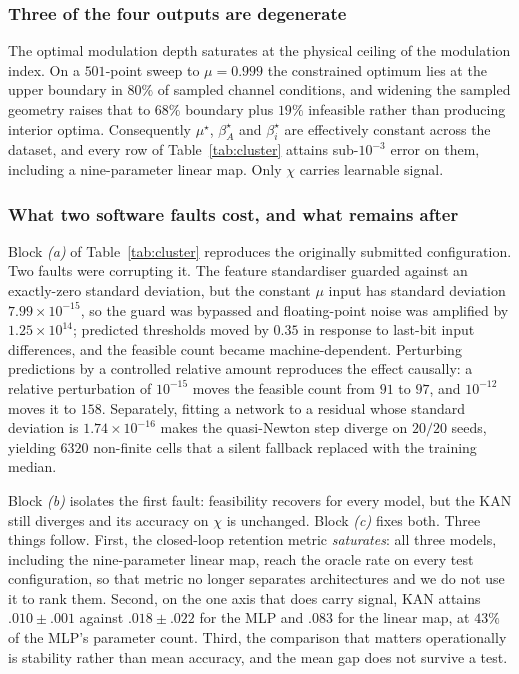\subsubsection{Three of the four outputs are degenerate}\label{sec:results:degenerate}
The optimal modulation depth saturates at the physical ceiling of the modulation index. On a
$501$-point sweep to $\mu{=}0.999$ the constrained optimum lies at the upper boundary in
$80\%$ of sampled channel conditions, and widening the sampled geometry raises that to
$68\%$ boundary plus $19\%$ infeasible rather than producing interior optima. Consequently
$\mu^\star$, $\beta_A^\star$ and $\beta_i^\star$ are effectively constant across the dataset,
and every row of Table~\ref{tab:cluster} attains sub-$10^{-3}$ error on them, including a
nine-parameter linear map. Only $\chi$ carries learnable signal.

\subsubsection{What two software faults cost, and what remains after}\label{sec:results:faults}
Block \emph{(a)} of Table~\ref{tab:cluster} reproduces the originally submitted
configuration. Two faults were corrupting it. The feature standardiser guarded against an
exactly-zero standard deviation, but the constant $\mu$ input has standard deviation
$7.99\times10^{-15}$, so the guard was bypassed and floating-point noise was amplified by
$1.25\times10^{14}$; predicted thresholds moved by $0.35$ in response to last-bit input
differences, and the feasible count became machine-dependent. Perturbing predictions by a
controlled relative amount reproduces the effect causally: a relative perturbation of
$10^{-15}$ moves the feasible count from $91$ to $97$, and $10^{-12}$ moves it to $158$.
Separately, fitting a network to a residual whose standard deviation is
$1.74\times10^{-16}$ makes the quasi-Newton step diverge on $20/20$ seeds, yielding $6320$
non-finite cells that a silent fallback replaced with the training median.

Block \emph{(b)} isolates the first fault: feasibility recovers for every model, but the KAN
still diverges and its accuracy on $\chi$ is unchanged. Block \emph{(c)} fixes both. Three
things follow. First, the closed-loop retention metric \emph{saturates}: all three models,
including the nine-parameter linear map, reach the oracle rate on every test configuration,
so that metric no longer separates architectures and we do not use it to rank them. Second,
on the one axis that does carry signal, KAN attains $.010{\pm}.001$ against $.018{\pm}.022$
for the MLP and $.083$ for the linear map, at $43\%$ of the MLP's parameter count. Third,
the comparison that matters operationally is stability rather than mean accuracy, and the
mean gap does not survive a test.

